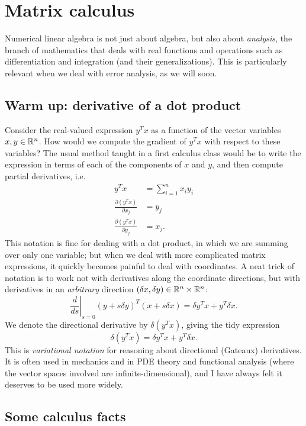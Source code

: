 \documentclass[12pt, leqno]{article} %
\begin{document}

\section{Matrix calculus}

Numerical linear algebra is not just about algebra, but also about
{\em analysis}, the branch of mathematics that deals with real
functions and operations such as differentiation and integration
(and their generalizations).  This is particularly relevant when
we deal with error analysis, as we will soon.

\subsection{Warm up: derivative of a dot product}

Consider the real-valued expression $y^T x$ as a function of
the vector variables $x, y \in \mathbb{R}^n$.  How would we compute
the gradient of $y^T x$ with respect to these variables?
The usual method taught in a first calculus class would be
to write the expression in terms of each of the components of $x$
and $y$, and then compute partial derivatives, i.e.
\begin{align*}
  y^T x &= \sum_{i=1}^n x_i y_i \\
  \frac{\partial (y^T x)}{\partial x_j} &= y_j \\
  \frac{\partial (y^T x)}{\partial y_j} &= x_j.
\end{align*}
This notation is fine for dealing with a dot product, in which
we are summing over only one variable; but when we deal with more
complicated matrix expressions, it quickly becomes painful to deal
with coordinates.  A neat trick of notation is to work not with
derivatives along the coordinate directions, but with derivatives
in an {\em arbitrary} direction
$(\delta x, \delta y) \in \mathbb{R}^n \times \mathbb{R}^n$:
\[
  \left. \frac{d}{ds} \right|_{s=0} (y+s \delta y)^T (x + s \delta x)
  = \delta y^T x + y^T \delta x.
\]
We denote the directional derivative by $\delta(y^T x)$, giving the
tidy expression
\[
  \delta(y^T x) = \delta y^T x + y^T \delta x.
\]
This is {\em variational notation} for reasoning about directional
(Gateaux) derivatives.  It is often used in
mechanics and in PDE theory and functional analysis
(where the vector spaces involved are infinite-dimensional),
and I have always felt it deserves to be used more widely.

\subsection{Some calculus facts}
\end{document}

